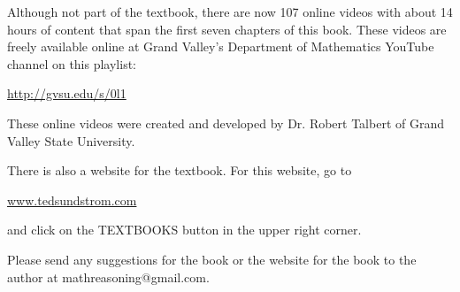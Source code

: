 \noindent
Although not part of the textbook, there are now 107 online videos with about 14 hours of content that span the first seven chapters of this book. These videos are freely available online at Grand Valley's Department of Mathematics YouTube channel on this playlist: 
 
\begin{center}
\url{http://gvsu.edu/s/0l1}
\end{center}
These online videos were created and developed by Dr. Robert Talbert of Grand Valley State University.

\noindent
There is also a website for the textbook.  For this website, go to 
\begin{center}
\url{www.tedsundstrom.com}
\end{center}
and click on the TEXTBOOKS button in the upper right corner.

Please send any suggestions for the book or the website for the book to the author at mathreasoning@gmail.com.


\endinput


%
%



